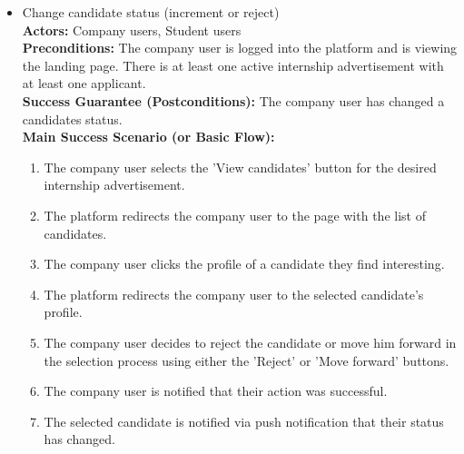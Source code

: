 \begin{itemize}[label={[\textbf{UC}]}, align=left, leftmargin=*]
    \item {} Change candidate status (increment or reject) \\
    \textbf{Actors:} Company users, Student users\\
     \textbf{Preconditions:} The company user is logged into the platform and is viewing the landing page. There is at least one active internship advertisement with at least one applicant.\\
     \textbf{Success Guarantee (Postconditions):} The company user has changed a candidates status. \\
     \textbf{Main Success Scenario (or Basic Flow):} 
     \begin{enumerate}[label=\arabic*.] 
        \item The company user selects the 'View candidates' button for the desired internship advertisement.
        \item The platform redirects the company user to the page with the list of candidates.
        \item The company user clicks the profile of a candidate they find interesting. 
        \item The platform redirects the company user to the selected candidate's profile.
        \item The company user decides to reject the candidate or move him forward in the selection process using either the 'Reject' or 'Move forward' buttons.
        \item The company user is notified that their action was successful.
        \item The selected candidate is notified via push notification that their status has changed.
     \end{enumerate} \\


\end{itemize}
